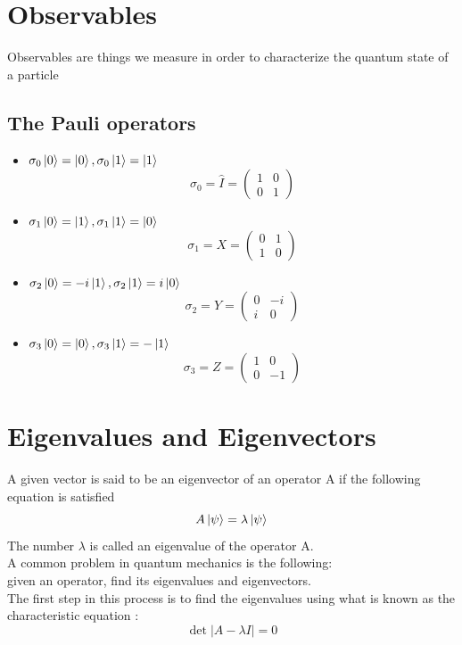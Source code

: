 \documentclass[12pt,oneside]{book}
\begin{document}
\section{Observables}
Observables are things we measure in order to characterize the quantum state of a particle
\subsection{The Pauli operators}
\begin{itemize}
    \item $\sigma_0\ket{0} = \ket{0} , \sigma_0\ket{1} = \ket{1}$
          \[\sigma_0 = \hat{I} = \left( \begin{matrix}
                      1 & 0 \\
                      0 & 1
                  \end{matrix}\right)\]
    \item $\sigma_1\ket{0} = \ket{1} , \sigma_1\ket{1} = \ket{0}$
          \[\sigma_1 = X = \left( \begin{matrix}
                      0 & 1 \\
                      1 & 0
                  \end{matrix}\right)\]
    \item $\sigma_2\ket{0} = -i\ket{1} , \sigma_2\ket{1} = i\ket{0}$
          \[\sigma_2 = Y = \left( \begin{matrix}
                      0 & -i \\
                      i & 0
                  \end{matrix}\right)\]
    \item $\sigma_3\ket{0} = \ket{0} , \sigma_3\ket{1} = -\ket{1}$
          \[\sigma_3 = Z = \left( \begin{matrix}
                      1 & 0  \\
                      0 & -1
                  \end{matrix}\right)\]
\end{itemize}
\section{Eigenvalues and Eigenvectors}
A given vector is said to be an eigenvector of an operator A if the following equation is satisfied
\[A\ket{\psi} = \lambda\ket{\psi}\]
The number $\lambda$ is called an eigenvalue of the operator A.\\
A common problem in quantum mechanics is the following: \\
given an operator, find its eigenvalues and eigenvectors.\\
The first step in this process is to find the eigenvalues using what is known as the characteristic equation :
\[\det|A-\lambda I| = 0\]
\end{document}
